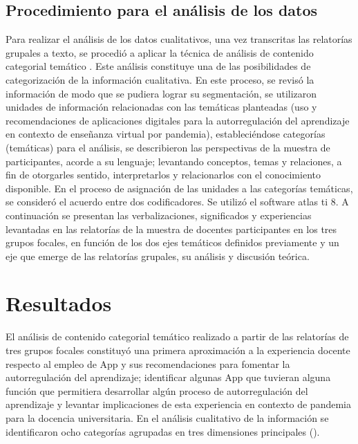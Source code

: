 \documentclass[spanish]{textolivre}
\begin{document}
\subsection{Procedimiento para el análisis de los datos}
Para realizar el análisis de los datos cualitativos, una vez transcritas las relatorías grupales a texto, se procedió a aplicar la técnica de análisis de contenido categorial temático \cite{andreu_tecnicas_2002}. Este análisis constituye una de las posibilidades de categorización de la información cualitativa. En este proceso, se revisó la información de modo que se pudiera lograr su segmentación, se utilizaron unidades de información relacionadas con las temáticas planteadas (uso y recomendaciones de aplicaciones digitales para la autorregulación del aprendizaje en contexto de enseñanza virtual por pandemia), estableciéndose categorías (temáticas) para el análisis, se describieron las perspectivas de la muestra de participantes, acorde a su lenguaje; levantando conceptos, temas  y relaciones, a fin de otorgarles sentido, interpretarlos y relacionarlos  con el conocimiento disponible. En el proceso de asignación de las unidades a las categorías temáticas, se consideró el acuerdo entre dos codificadores. Se utilizó el software atlas ti 8. A continuación se presentan las verbalizaciones, significados y experiencias levantadas en las relatorías de la muestra de docentes participantes en los tres grupos focales, en función de los dos ejes temáticos definidos previamente  y un eje que emerge de las relatorías grupales, su análisis y discusión  teórica. 

\section{Resultados}
El análisis de contenido categorial temático realizado a partir de las relatorías de tres grupos focales constituyó una primera aproximación a la experiencia docente respecto al empleo de  App  y sus recomendaciones para fomentar la autorregulación del aprendizaje; identificar algunas App que tuvieran alguna función que permitiera desarrollar algún proceso de autorregulación del aprendizaje y levantar  implicaciones de esta experiencia en contexto de pandemia para la docencia universitaria. En el análisis cualitativo de la información se identificaron ocho categorías agrupadas en tres dimensiones principales (). 
\end{document}
